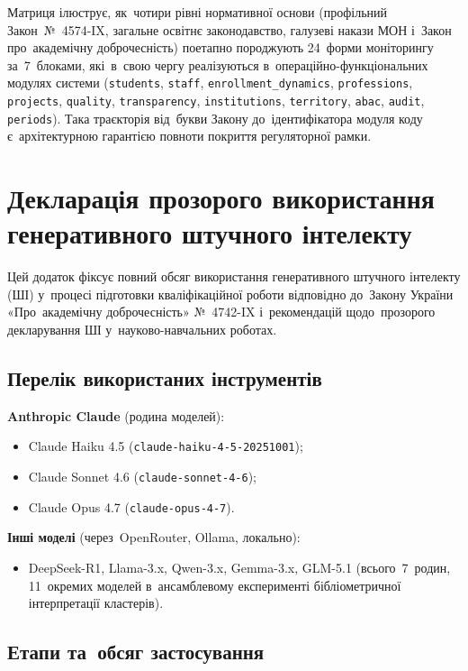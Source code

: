 Матриця ілюструє, як~чотири рівні нормативної основи (профільний Закон~№~4574-IX, загальне освітнє законодавство, галузеві накази МОН і~Закон про~академічну доброчесність) поетапно породжують 24~форми моніторингу за~7~блоками, які~в~свою чергу реалізуються в~операційно-функціональних модулях системи (\texttt{students}, \texttt{staff}, \texttt{enrollment\_dynamics}, \texttt{professions}, \texttt{projects}, \texttt{quality}, \texttt{transparency}, \texttt{institutions}, \texttt{territory}, \texttt{abac}, \texttt{audit}, \texttt{periods}). Така траєкторія від~букви Закону до~ідентифікатора модуля коду є~архітектурною гарантією повноти покриття регуляторної рамки.


\section{Декларація прозорого використання генеративного штучного інтелекту}
\label{app:genai_decl}

Цей додаток фіксує повний обсяг використання генеративного штучного інтелекту (ШІ) у~процесі підготовки кваліфікаційної роботи відповідно до~Закону України «Про~академічну доброчесність» №~4742-IX і~рекомендацій щодо~прозорого декларування ШІ у~науково-навчальних роботах.

\subsection*{Перелік використаних інструментів}

\noindent\textbf{Anthropic Claude} (родина моделей):
\begin{itemize}
    \item Claude Haiku 4.5 (\texttt{claude-haiku-4-5-20251001});
    \item Claude Sonnet 4.6 (\texttt{claude-sonnet-4-6});
    \item Claude Opus 4.7 (\texttt{claude-opus-4-7}).
\end{itemize}

\noindent\textbf{Інші моделі} (через~OpenRouter, Ollama, локально):
\begin{itemize}
    \item DeepSeek-R1, Llama-3.x, Qwen-3.x, Gemma-3.x, GLM-5.1 (всього~7~родин, 11~окремих моделей в~ансамблевому експерименті бібліометричної інтерпретації кластерів).
\end{itemize}

\subsection*{Етапи та~обсяг застосування}

